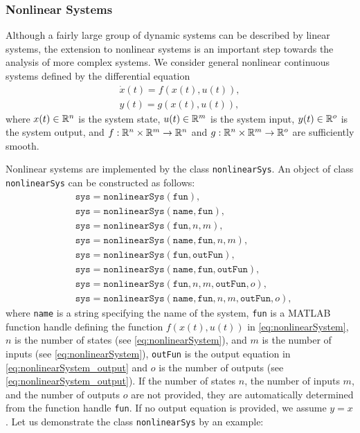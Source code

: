 \subsubsection{Nonlinear Systems} \label{sec:nonlinearSystems}

Although a fairly large group of dynamic systems can be described by linear systems, the extension to nonlinear systems is an important step towards the analysis of more complex systems. We consider general nonlinear continuous systems defined by the differential equation
\begin{align}
	\dot x(t) = f(x(t),u(t)), \label{eq:nonlinearSystem} \\
	y(t) = g(x(t),u(t)), \label{eq:nonlinearSystem_output}
\end{align}
where $x(t) \in \mathbb{R}^n$ is the system state, $u(t) \in \mathbb{R}^m$ is the system input, $y(t) \in \mathbb{R}^o$ is the system output, and $f:\mathbb{R}^n \times \mathbb{R}^m \to \mathbb{R}^n$ and $g:\mathbb{R}^n \times \mathbb{R}^m \to \mathbb{R}^o$ are sufficiently smooth. 

Nonlinear systems are implemented by the class \texttt{nonlinearSys}. An object of class \texttt{nonlinearSys} can be constructed as follows:
\begin{equation*}
	\begin{split}
		& \texttt{sys} = \texttt{nonlinearSys}(\texttt{fun}), \\
     	& \texttt{sys} = \texttt{nonlinearSys}(\texttt{name},\texttt{fun}), \\
    	& \texttt{sys} = \texttt{nonlinearSys}(\texttt{fun},n,m), \\
     	& \texttt{sys} = \texttt{nonlinearSys}(\texttt{name},\texttt{fun},n,m), \\
     	& \texttt{sys} = \texttt{nonlinearSys}(\texttt{fun},\texttt{outFun}), \\
     	& \texttt{sys} = \texttt{nonlinearSys}(\texttt{name},\texttt{fun},\texttt{outFun}), \\
     	& \texttt{sys} = \texttt{nonlinearSys}(\texttt{fun},n,m,\texttt{outFun},o), \\
     	& \texttt{sys} = \texttt{nonlinearSys}(\texttt{name},\texttt{fun},n,m,\texttt{outFun},o),
	\end{split}
\end{equation*} 
where \texttt{name} is a string specifying the name of the system, \texttt{fun} is a MATLAB function handle defining the function $f(x(t),u(t))$ in \eqref{eq:nonlinearSystem}, $n$ is the number of states (see \eqref{eq:nonlinearSystem}), and $m$ is the number of inputs (see \eqref{eq:nonlinearSystem}), \texttt{outFun} is the output equation in \eqref{eq:nonlinearSystem_output} and $o$ is the number of outputs (see \eqref{eq:nonlinearSystem_output}). If the number of states $n$, the number of inputs $m$, and the number of outputs $o$ are not provided, they are automatically determined from the function handle \texttt{fun}. If no output equation is provided, we assume $y = x$.
Let us demonstrate the class \texttt{nonlinearSys} by an example:

